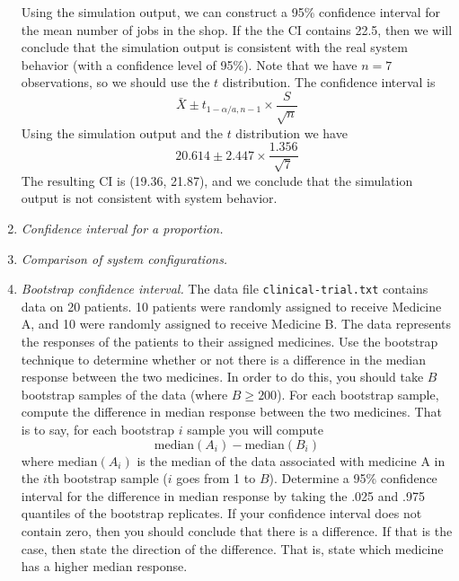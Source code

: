 \begin{enumerate}
\begin{solution}
  \bs Using the simulation output, we can construct a 95\% confidence
  interval for the mean number of jobs in the shop. If the the CI
  contains 22.5, then we will conclude that the simulation output
  is consistent with the real system behavior (with a confidence level
  of 95\%). Note that we have $n=7$ observations, so we should use the
  $t$ distribution. The confidence interval is
  \[ \bar{X} \pm t_{1-\alpha/a,n-1} \times \frac{S}{\sqrt{n}} \]
 Using the simulation output and the $t$ distribution we have
  \[  20.614 \pm 2.447 \times \frac{1.356}{\sqrt{7}}  \]
  The resulting CI is (19.36, 21.87), and we conclude that the
  simulation output is not consistent with system behavior.
\end{solution}


\item \emph{Confidence interval for a proportion.} 

\item \emph{Comparison of system configurations.}


\item \emph{Bootstrap confidence interval.} The data file
  \texttt{clinical-trial.txt} contains data on 20 patients. 10
  patients were randomly assigned to receive Medicine A, and 10 were
  randomly assigned to receive Medicine B. The data represents the
  responses of the patients to their assigned medicines. Use the
  bootstrap technique to determine whether or not there is a
  difference in the median response between the two medicines.  In
  order to do this, you should take $B$ bootstrap samples of the data
  (where $B \geq 200$). For each bootstrap sample, compute the
  difference in median response between the two medicines. That is to
  say, for each bootstrap $i$ sample you will compute
  \[
  \text{median}(A_i) - \text{median}(B_i)
  \]
  where $\text{median}(A_i)$ is the median of the data associated with
  medicine A in the $i$th bootstrap sample ($i$ goes from 1 to
  $B$). Determine a 95\% confidence interval for the difference in
  median response by taking the .025 and .975 quantiles of the
  bootstrap replicates. If your confidence interval does not contain
  zero, then you should conclude that there is a difference. If that
  is the case, then state the direction of the difference. That is,
  state which medicine has a higher median response. \label{ex:boot}



\end{enumerate}
